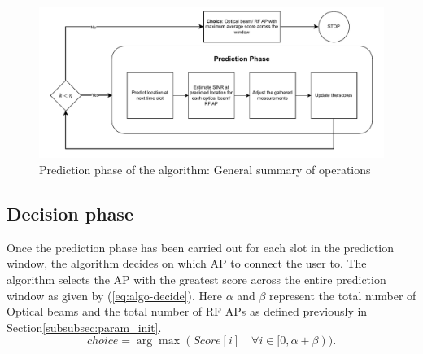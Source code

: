 \begin{figure}
    \centering
    \includegraphics[width=1\linewidth]{Figures/Algorithm-design.drawio.pdf}
    \caption{Prediction phase of the algorithm: General summary of operations}
    \label{fig:algo-prediction}
\end{figure}
\subsection{Decision phase}
Once the prediction phase has been carried out for each slot in the prediction window, the algorithm decides on which AP to connect the user to. The algorithm selects the AP with the greatest score across the entire prediction window as given by (\ref{eq:algo-decide}). Here $\alpha$ and $\beta$ represent the total number of Optical beams and the total number of RF APs as defined previously in Section\ref{subsubsec:param_init}. 
\begin{equation}
        {choice} = \arg \max({Score}[i] \quad \forall i \in [0, \alpha + \beta)).
        \label{eq:algo-decide}
    \end{equation}


